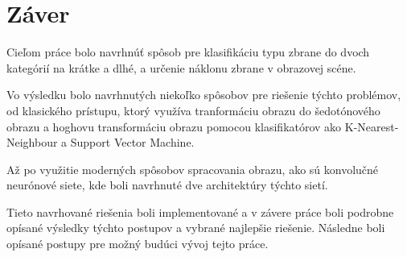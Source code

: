 
\chapter{Záver}

Cieľom práce bolo navrhnúť spôsob pre klasifikáciu typu zbrane do dvoch kategórií na krátke a dlhé, a
    určenie náklonu zbrane v obrazovej scéne.

Vo výsledku bolo navrhnutých niekoľko spôsobov pre riešenie týchto problémov, od klasického prístupu,
    ktorý využíva tranformáciu obrazu do šedotónového obrazu a hoghovu transformáciu obrazu pomocou
    klasifikatórov ako K-Nearest-Neighbour a Support Vector Machine.

Až po využitie moderných spôsobov spracovania obrazu, ako sú konvolučné neurónové siete, kde boli navrhnuté
    dve architektúry týchto sietí.

Tieto navrhované riešenia boli implementované a v závere práce boli podrobne opísané výsledky týchto postupov a
    vybrané najlepšie riešenie.
Následne boli opísané postupy pre možný budúci vývoj tejto práce.

